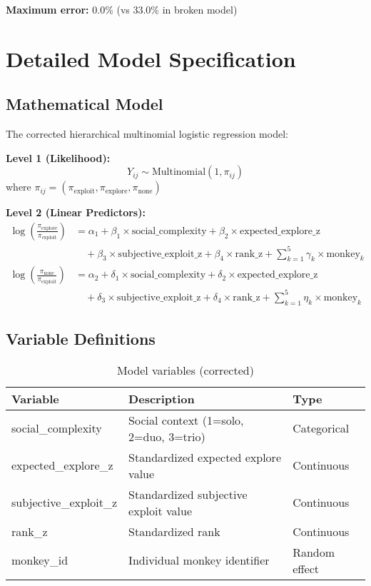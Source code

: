 \documentclass[11pt]{article}
\begin{document}
\textbf{Maximum error:} 0.0\% (vs 33.0\% in broken model)

\section{Detailed Model Specification}

\subsection{Mathematical Model}

The corrected hierarchical multinomial logistic regression model:

\textbf{Level 1 (Likelihood):}
\begin{equation}
Y_{ij} \sim \text{Multinomial}(1, \pi_{ij})
\end{equation}
where $\pi_{ij} = (\pi_{\text{exploit}}, \pi_{\text{explore}}, \pi_{\text{none}})$

\textbf{Level 2 (Linear Predictors):}
\begin{align}
\log\left(\frac{\pi_{\text{explore}}}{\pi_{\text{exploit}}}\right) &= \alpha_1 + \beta_1 \times \text{social\_complexity} + \beta_2 \times \text{expected\_explore\_z} \\
&\quad + \beta_3 \times \text{subjective\_exploit\_z} + \beta_4 \times \text{rank\_z} + \sum_{k=1}^{5} \gamma_k \times \text{monkey}_k \\
\log\left(\frac{\pi_{\text{none}}}{\pi_{\text{exploit}}}\right) &= \alpha_2 + \delta_1 \times \text{social\_complexity} + \delta_2 \times \text{expected\_explore\_z} \\
&\quad + \delta_3 \times \text{subjective\_exploit\_z} + \delta_4 \times \text{rank\_z} + \sum_{k=1}^{5} \eta_k \times \text{monkey}_k
\end{align}

\subsection{Variable Definitions}

\begin{table}[h]
\centering
\begin{tabular}{lll}
\toprule
\textbf{Variable} & \textbf{Description} & \textbf{Type} \\
\midrule
social\_complexity & Social context (1=solo, 2=duo, 3=trio) & Categorical \\
expected\_explore\_z & Standardized expected explore value & Continuous \\
subjective\_exploit\_z & Standardized subjective exploit value & Continuous \\
rank\_z & Standardized rank & Continuous \\
monkey\_id & Individual monkey identifier & Random effect \\
\bottomrule
\end{tabular}
\caption{Model variables (corrected)}
\end{table}
\end{document}
